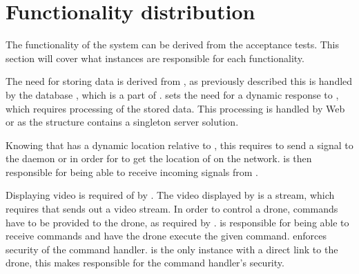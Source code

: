 \section{Functionality distribution}
\label{sec:functionality_distribution}

The functionality of the system can be derived from the acceptance tests.
This section will cover what instances are responsible for each functionality.

The need for storing data is derived from , as previously described this is handled by the database , which is a part of .
 sets the need for a dynamic response to , which requires processing of the stored data.
This processing is handled by Web or  as the structure contains a singleton server solution.

Knowing that  has a dynamic location relative to , this requires  to send a signal to the daemon or  in order for  to get the location of  on the network.
 is then responsible for being able to receive incoming signals from .

Displaying video is required of  by .
The video displayed by  is a stream, which requires that  sends out a video stream.
In order to control a drone, commands have to be provided to the drone, as required by .
 is responsible for being able to receive commands and have the drone execute the given command.
 enforces security of the command handler.
 is the only instance with a direct link to the drone, this makes  responsible for the command handler's security.






